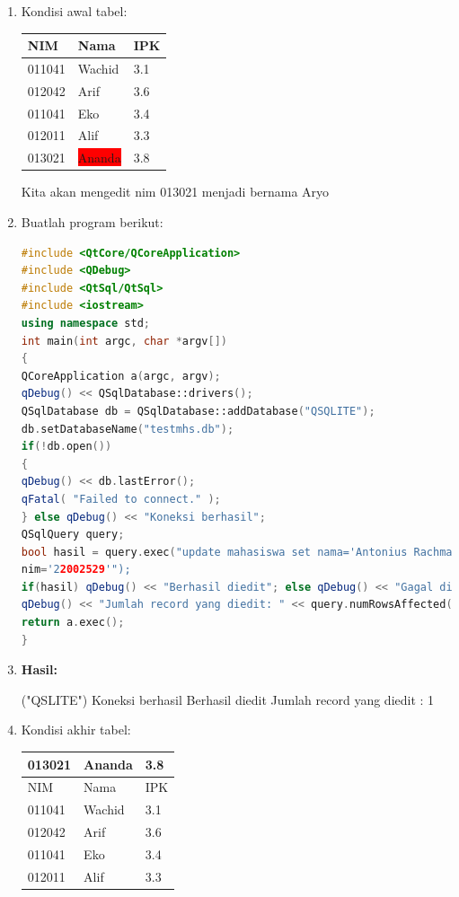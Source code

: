 \begin{enumerate}
\item Kondisi awal tabel:

\begin{tabular}{|l|l|l|}
\hline
NIM & Nama & IPK \\ \hline
011041 & Wachid & 3.1 \\ \hline
012042 & Arif & 3.6 \\ \hline
011041 & Eko & 3.4 \\ \hline
012011 & Alif & 3.3 \\ \hline
013021 & \colorbox{red}{Ananda} & 3.8 \\ \hline
\end{tabular}

Kita akan mengedit nim 013021 menjadi bernama Aryo

\item Buatlah program berikut:

\begin{lstlisting}[language=c++, caption=Mengedit data pada SQLite]
#include <QtCore/QCoreApplication>
#include <QDebug>
#include <QtSql/QtSql>
#include <iostream>
using namespace std;
int main(int argc, char *argv[])
{
QCoreApplication a(argc, argv);
qDebug() << QSqlDatabase::drivers();
QSqlDatabase db = QSqlDatabase::addDatabase("QSQLITE");
db.setDatabaseName("testmhs.db");
if(!db.open())
{
qDebug() << db.lastError();
qFatal( "Failed to connect." );
} else qDebug() << "Koneksi berhasil";
QSqlQuery query;
bool hasil = query.exec("update mahasiswa set nama='Antonius Rachmat C' where
nim='22002529'");
if(hasil) qDebug() << "Berhasil diedit"; else qDebug() << "Gagal diedit";
qDebug() << "Jumlah record yang diedit: " << query.numRowsAffected();
return a.exec();
}
\end{lstlisting}

\item \textbf{Hasil:}
\begin{lcverbatim}
("QSLITE")
Koneksi berhasil
Berhasil diedit
Jumlah record yang diedit : 1
\end{lcverbatim}
\item Kondisi akhir tabel:

\begin{tabular}{|l|l|l|}
\hline
013021 & Ananda & 3.8 \\ \hline
NIM & Nama & IPK \\ \hline
011041 & Wachid & 3.1 \\ \hline
012042 & Arif & 3.6 \\ \hline
011041 & Eko & 3.4 \\ \hline
012011 & Alif & 3.3 \\ \hline

\end{tabular}
\end{enumerate}

